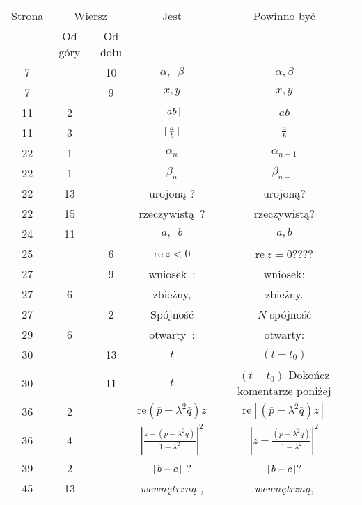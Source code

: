 \documentclass[a4paper,11pt]{article}
\newcommand{\re}{\textrm{re}}
\begin{document}
\begin{center}

  \begin{tabular}{|c|c|c|c|c|}
    \hline
    Strona & \multicolumn{2}{c|}{Wiersz} & Jest
                              & Powinno być \\ \cline{2-3}
    & Od góry & Od dołu & & \\
    \hline
    \hphantom{0}7 & & 10 & $\alpha,\:\; \beta$ & $\alpha, \beta$ \\
    \hphantom{0}7 & & \hphantom{0}9 & $x,\! y$ & $x, y$ \\
    11 & \hphantom{0}2 & & $|\, {  a b  } \,|$ & $ab$ \\
    11 & \hphantom{0}3 & & $|\, {  \tfrac{ a }{ b }  } \,|$
    & $\tfrac{ a }{ b }$ \\
    22 & \hphantom{0}1 & & $\alpha_{ n }$ & $\alpha_{ n - 1 }$ \\
    22 & \hphantom{0}1 & & $\beta_{ n }$ & $\beta_{ n - 1 }$ \\
    22 & 13 & & urojoną ? & urojoną? \\
    22 & 15 & & rzeczywistą~? & rzeczywistą? \\
    24 & 11 & & $a, \:\; b$ & $a, b$ \\
    25 & & \hphantom{0}6 & $\textrm{re}\, z < 0$
    & $\textrm{re}\, z = 0$???? \\
    27 & & \hphantom{0}9 & wniosek~: & wniosek: \\
    27 & \hphantom{0}6 & & zbieżny, & zbieżny. \\
    27 & & \hphantom{0}2 & Spójność & $N$-spójność \\
    29 & \hphantom{0}6 & & otwarty~: & otwarty: \\
    30 & & 13 & $t$ & $( t - t_{ 0 } )$ \\
    30 & & 11 & $t$ & $( t - t_{ 0 } )$ Dokończ komentarze poniżej \\
    36 & \hphantom{0}2 & & $\re( \overline{ p } - \lambda^{ 2 } \overline{ q } ) z$
    & $\re[ ( \overline{ p } - \lambda^{ 2 } \overline{ q } ) z ]$ \\
    36 & \hphantom{0}4 & & $\left| \frac{ z - ( p - \lambda^{ 2 } q) }
                 { 1 - \lambda^{ 2 } } \right|^{ 2 }$
           & $\left| z - \frac{ ( p - \lambda^{ 2 } q) }
             { 1 - \lambda^{ 2 } } \right|^{ 2 }$ \\
    39 & \hphantom{0}2 & & $|\, {  b - c  } \,|$ ? & $|\, {  b - c  } \,|$? \\
    45 & 13 & & \textit{wewnętrzną ,} & \textit{wewnętrzną,} \\

\end{tabular}
\end{center}
\end{document}
